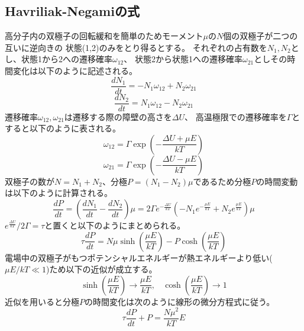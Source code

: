 \documentclass[dvipdfmx,12pt,a4paper]{jreport}
\begin{document}
			\subsection{Havriliak-Negamiの式}
			高分子内の双極子の回転緩和を簡単のためモーメント$\mu$の$N$個の双極子が二つの互いに逆向きの
			状態(1,2)のみをとり得るとする。
			それぞれの占有数を$N_1, N_2$とし、状態1から2への遷移確率$\omega_{12}$、
			状態2から状態1への遷移確率$\omega_{21}$としその時間変化は以下のように記述される。
			\begin{equation}
				\frac{dN_1}{dt}=-N_1\omega_{12}+N_2\omega_{21}
			\end{equation}
			\begin{equation}
				\frac{dN_2}{dt}=N_1\omega_{12}-N_2\omega_{21}
			\end{equation}
			遷移確率$\omega_{12}, \omega_{21}$は遷移する際の障壁の高さを$\Delta U$、
			高温極限での遷移確率を$\Gamma$とすると以下のように表される。
			\begin{equation}
				\omega_{12}=\Gamma \exp\left(-\frac{\Delta U+\mu E}{kT} \right)
			\end{equation}
			\begin{equation}
				\omega_{21}=\Gamma \exp\left(- \frac{\Delta U-\mu E}{kT} \right)
			\end{equation}
			双極子の数が$N=N_1+N_2$、分極$P=(N_1-N_2)\mu$であるため分極$P$の時間変動は以下のように計算される。
			\begin{equation}
				\frac{dP}{dt} = \left( \frac{dN_1}{dt}-\frac{dN_2}{dt}\right)\mu
				=2\Gamma e^{-\frac{\Delta U}{kT}}\left(-N_1 e^{-\frac{\mu E}{kT}}+N_2e^{\frac{\mu E}{kT}} \right)\mu
			\end{equation}
			$e^{\frac{\Delta U}{kT}}/2\Gamma=\tau$と置くと以下のようにまとめられる。
			\begin{equation}
				\tau \frac{dP}{dt}=N\mu \sinh\left( \frac{\mu E}{kT}\right) - P \cosh\left( \frac{\mu E}{kT}\right)
			\end{equation}
			電場中の双極子がもつポテンシャルエネルギーが熱エネルギーより低い($\mu E/kT \ll 1$)ため以下の近似が成立する。
			\begin{equation}
				\sinh \left(\frac{\mu E}{kT} \right)\rightarrow \frac{\mu E}{kT}, \ \ \ \ \cosh\left(\frac{\mu E}{kT}\right)\rightarrow 1
			\end{equation}
			近似を用いると分極$P$の時間変化は次のように線形の微分方程式に従う。
			\begin{equation}
				\tau \frac{dP}{dt}+P=\frac{N\mu^2}{kT}E
			\end{equation}
\end{document}
